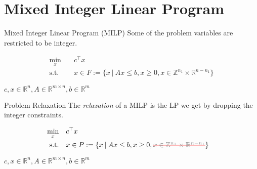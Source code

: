 \section{Mixed Integer Linear Program}

\begin{frame}{Mixed Integer Linear Program (MILP)}
Some of the problem variables are restricted to be integer.
\begin{center}
\begin{minipage}{0.8\textwidth}
	\begin{tcolorbox}[colback=white, title={MILP Standard Form}]
    \begin{align*}
    	\min_{x}\quad &c^\top x \\
    	\text{s.t.}\quad & x\in F := \{x \:\vert\: Ax \leq b, x \geq 0, x \in \mathbb{Z}^{n_1} \times \mathbb{R}^{n-n_1} \}
    \end{align*}
    \end{tcolorbox}
    $c,x \in \mathbb{R}^n, A \in \mathbb{R}^{m \times n}, b \in \mathbb{R}^m$
\end{minipage}
\end{center}
\end{frame}

\begin{frame}{Problem Relaxation}
The \emph{relaxation} of a MILP is the LP we get by dropping the integer constraints.
\begin{center}
\begin{minipage}{0.8\textwidth}
	\begin{tcolorbox}[colback=white, title={Relaxed MILP}]
    \begin{align*}
    	\min_{x}\quad &c^\top x \\
    	\text{s.t.}\quad &x \in P := \{x \:\vert\: Ax \leq b, x \geq 0, \text{\color{red}\sout{\color{gray} $x \in \mathbb{Z}^{n_1} \times \mathbb{R}^{n-n_1}$}} \}
    	&
    \end{align*}
    \end{tcolorbox}
    $c,x \in \mathbb{R}^n, A \in \mathbb{R}^{m \times n}, b \in \mathbb{R}^m$
\end{minipage}
\end{center}
\end{frame}


